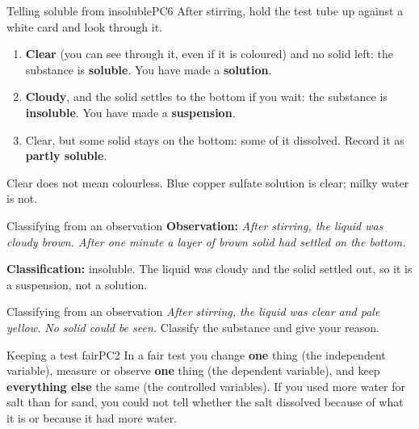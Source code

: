 
\begin{technique}{Telling soluble from insoluble}{PC6}
After stirring, hold the test tube up against a white card and look through it.
\begin{enumerate}[leftmargin=1.6em, itemsep=1pt, topsep=3pt]
  \item \textbf{Clear} (you can see through it, even if it is coloured) and no solid left: the substance is \textbf{soluble}. You have made a \textbf{solution}.
  \item \textbf{Cloudy}, and the solid settles to the bottom if you wait: the substance is \textbf{insoluble}. You have made a \textbf{suspension}.
  \item Clear, but some solid stays on the bottom: some of it dissolved. Record it as \textbf{partly soluble}.
\end{enumerate}
Clear does not mean colourless. Blue copper sulfate solution is clear; milky water is not.
\end{technique}

\begin{workedex}{Classifying from an observation}
\textbf{Observation:} \emph{After stirring, the liquid was cloudy brown. After one minute a layer of brown solid had settled on the bottom.}

\smallskip
\textbf{Classification:} insoluble. The liquid was cloudy and the solid settled out, so it is a suspension, not a solution.
\end{workedex}

\begin{wedo}{Classifying from an observation}
\emph{After stirring, the liquid was clear and pale yellow. No solid could be seen.} Classify the substance and give your reason.
\answerbox{3cm}
\end{wedo}

\begin{technique}{Keeping a test fair}{PC2}
In a fair test you change \textbf{one} thing (the independent variable), measure or observe \textbf{one} thing (the dependent variable), and keep \textbf{everything else} the same (the controlled variables). If you used more water for salt than for sand, you could not tell whether the salt dissolved because of what it is or because it had more water.
\end{technique}

